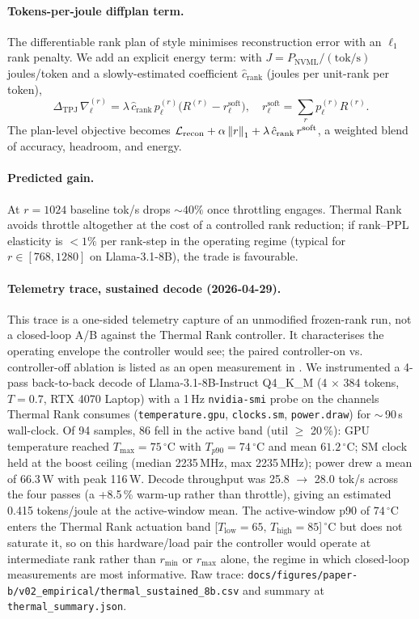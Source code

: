 \documentclass[11pt]{article}
\begin{document}
\paragraph{Tokens-per-joule diffplan term.}  The differentiable rank plan
of \cite{robbins1951sa} style minimises reconstruction error with an
$\ell_1$ rank penalty.  We add an explicit energy term: with
$J=P_\text{NVML}/(\text{tok/s})$ joules/token and a slowly-estimated
coefficient $\hat c_\text{rank}$ (joules per unit-rank per token),
\[
\Delta_\text{TPJ}\,\nabla_\ell^{(r)}=
\lambda\,\hat c_\text{rank}\,p_\ell^{(r)}\bigl(R^{(r)}-r^\text{soft}_\ell\bigr),
\quad r^\text{soft}_\ell=\sum_r p_\ell^{(r)}R^{(r)}.
\]
The plan-level objective becomes $\mathcal L_\text{recon}+\alpha\left\lVert r \right\rVert_1
+\lambda\,\hat c_\text{rank}\,r^\text{soft}$, a weighted blend of accuracy,
headroom, and energy.

\paragraph{Predicted gain.}  At $r{=}1024$ baseline tok/s drops $\sim 40\%$
once throttling engages.  Thermal Rank avoids throttle altogether at the
cost of a controlled rank reduction; if rank--PPL elasticity is $<1\%$ per
rank-step in the operating regime (typical for $r\in[768,1280]$ on
Llama-3.1-8B), the trade is favourable.

\paragraph{Telemetry trace, sustained decode (2026-04-29).}
This trace is a one-sided telemetry capture of an unmodified frozen-rank
run, not a closed-loop A/B against the Thermal Rank controller. It
characterises the operating envelope the controller would see; the paired
controller-on vs. controller-off ablation is listed as an open
measurement in .
We instrumented a 4-pass back-to-back decode of Llama-3.1-8B-Instruct
Q4\_K\_M (4 $\times$ 384 tokens, $T{=}0.7$, RTX 4070 Laptop) with a
1\,Hz \texttt{nvidia-smi} probe on the channels Thermal Rank consumes
(\texttt{temperature.gpu}, \texttt{clocks.sm}, \texttt{power.draw}) for
$\sim$\,90\,s wall-clock. Of 94 samples, 86 fell in the active band
(util $\geq$ 20\,\%): GPU temperature reached $T_\text{max}{=}75\,^\circ\mathrm{C}$
with $T_{p90}{=}74\,^\circ\mathrm{C}$ and mean $61.2\,^\circ\mathrm{C}$;
SM clock held at the boost ceiling (median 2235\,MHz, max 2235\,MHz);
power drew a mean of 66.3\,W with peak 116\,W. Decode throughput was
25.8 $\to$ 28.0 tok/s across the four passes (a +8.5\,\% warm-up
rather than throttle), giving an estimated
0.415 tokens/joule at the active-window mean. The active-window
p90 of $74\,^\circ\mathrm{C}$ enters the Thermal Rank actuation band
[$T_\text{low}{=}65,\,T_\text{high}{=}85$]\,$^\circ\mathrm{C}$ but does
not saturate it, so on this hardware/load pair the controller would
operate at intermediate rank rather than $r_\text{min}$ or
$r_\text{max}$ alone, the regime in which closed-loop measurements
are most informative. Raw trace:
\texttt{docs/figures/paper-b/v02\_empirical/thermal\_sustained\_8b.csv}
and summary at \texttt{thermal\_summary.json}.
\end{document}
